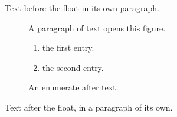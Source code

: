 \documentclass[10pt]{article}
\begin{document}
Text before the float in its own paragraph.

\begin{figure}[h]
A paragraph of text opens this figure.
\begin{enumerate}
\item the first entry.
\item the second entry.
\end{enumerate}
\caption{An enumerate after text.}
\end{figure}

Text after the float, in a paragraph of its own.
\end{document}
